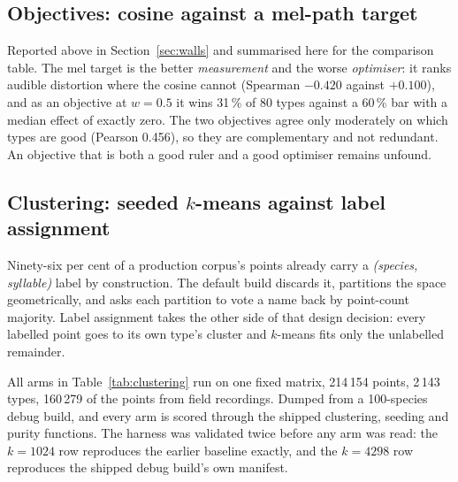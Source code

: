 \documentclass[10pt,twocolumn,a4paper]{article}
\begin{document}
\subsection{Objectives: cosine against a mel-path target}
\label{sec:ruler}

Reported above in Section~\ref{sec:walls} and summarised here for the comparison table. The
mel target is the better \emph{measurement} and the worse \emph{optimiser}: it ranks audible
distortion where the cosine cannot (Spearman $-0.420$ against $+0.100$), and as an
objective at $w = 0.5$ it wins 31\,\% of 80 types against a 60\,\% bar with a median effect
of exactly zero. The two objectives agree only moderately on which types are good (Pearson
0.456), so they are complementary and not redundant. An objective that is both a good
ruler and a good optimiser remains unfound.

\subsection{Clustering: seeded $k$-means against label assignment}

Ninety-six per cent of a production corpus's points already carry a
\emph{(species, syllable)} label by construction. The default build discards it, partitions
the space geometrically, and asks each partition to vote a name back by point-count
majority. Label assignment takes the other side of that design decision: every labelled
point goes to its own type's cluster and $k$-means fits only the unlabelled remainder.

All arms in Table~\ref{tab:clustering} run on one fixed matrix, 214\,154 points, 2\,143
types, 160\,279 of the points from field recordings. Dumped from a 100-species debug
build, and every arm is scored through the shipped clustering, seeding and purity functions.
The harness was validated twice before any arm was read: the $k = 1024$ row reproduces the
earlier baseline exactly, and the $k = 4298$ row reproduces the shipped debug build's own
manifest.
\end{document}
